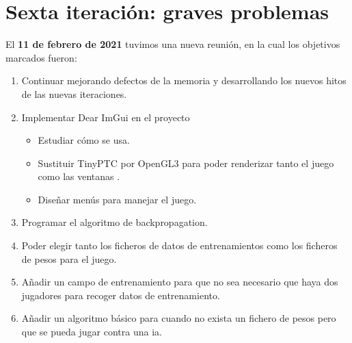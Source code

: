 \section{Sexta iteración: graves problemas}
El \textbf{11 de febrero de 2021} tuvimos una nueva reunión, en la cual los objetivos marcados fueron:
\begin{enumerate}
	\item Continuar mejorando defectos de la memoria y desarrollando los nuevos hitos de las nuevas iteraciones.
	\item Implementar Dear ImGui en el proyecto
	\begin{itemize}
		\item Estudiar cómo se usa.
		\item Sustituir TinyPTC por OpenGL3 para poder renderizar tanto el juego como las ventanas .
		\item Diseñar menús para manejar el juego.
	\end{itemize}
	\item Programar el algoritmo de backpropagation.
	\item Poder elegir tanto los ficheros de datos de entrenamientos como los ficheros de pesos para el juego.
	\item Añadir un campo de entrenamiento para que no sea necesario que haya dos jugadores para recoger datos de entrenamiento.
	\item Añadir un algoritmo básico para cuando no exista un fichero de pesos pero que se pueda jugar contra una \gls{ia}.
\end{enumerate}

